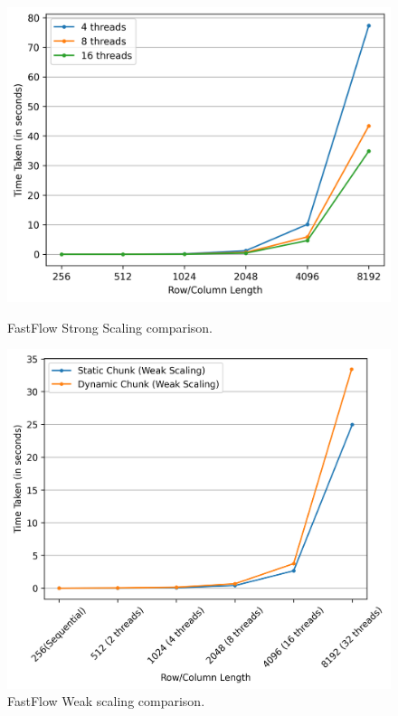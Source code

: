 \begin{figure}[h!]
    \centering
    \begin{minipage}[t]{0.49\textwidth}
        \centering
        \includegraphics[width=\textwidth]{img/FastFlow/ff_static_graph.png}
        \caption{FastFlow Strong Scaling comparison.}
        \label{FF_Strong_scaling}
    \end{minipage}
    \hfill
    \begin{minipage}[t]{0.49\textwidth}
        \centering
        \includegraphics[width=\textwidth]{img/FastFlow/ff_static_vs_dynamic.png}
        \caption{FastFlow Weak scaling comparison.}
        \label{FF_Chunk}
    \end{minipage}
    

\end{figure}
